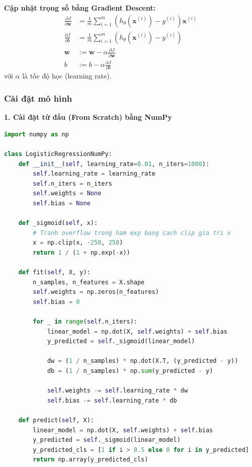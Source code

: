 \documentclass[12pt,a4paper]{article}
\begin{document}
\textbf{Cập nhật trọng số bằng Gradient Descent:}
\begin{align}
\frac{\partial J}{\partial \mathbf{w}} &= \frac{1}{m} \sum_{i=1}^{m} \left( h_{\theta}(\mathbf{x}^{(i)}) - y^{(i)} \right) \mathbf{x}^{(i)} \\
\frac{\partial J}{\partial b} &= \frac{1}{m} \sum_{i=1}^{m} \left( h_{\theta}(\mathbf{x}^{(i)}) - y^{(i)} \right) \\
\mathbf{w} &:= \mathbf{w} - \alpha \frac{\partial J}{\partial \mathbf{w}} \\
b &:= b - \alpha \frac{\partial J}{\partial b}
\end{align}
với $\alpha$ là tốc độ học (learning rate).

\newpage
\subsubsection{Cài đặt mô hình}

\textbf{1. Cài đặt từ đầu (From Scratch) bằng NumPy}
\begin{lstlisting}[language=Python]
import numpy as np

class LogisticRegressionNumPy:
    def __init__(self, learning_rate=0.01, n_iters=1000):
        self.learning_rate = learning_rate
        self.n_iters = n_iters
        self.weights = None
        self.bias = None
        
    def _sigmoid(self, x):
        # Tranh overflow trong ham exp bang cach clip gia tri x
        x = np.clip(x, -250, 250)
        return 1 / (1 + np.exp(-x))
        
    def fit(self, X, y):
        n_samples, n_features = X.shape
        self.weights = np.zeros(n_features)
        self.bias = 0
        
        for _ in range(self.n_iters):
            linear_model = np.dot(X, self.weights) + self.bias
            y_predicted = self._sigmoid(linear_model)
            
            dw = (1 / n_samples) * np.dot(X.T, (y_predicted - y))
            db = (1 / n_samples) * np.sum(y_predicted - y)
            
            self.weights -= self.learning_rate * dw
            self.bias -= self.learning_rate * db
            
    def predict(self, X):
        linear_model = np.dot(X, self.weights) + self.bias
        y_predicted = self._sigmoid(linear_model)
        y_predicted_cls = [1 if i > 0.5 else 0 for i in y_predicted]
        return np.array(y_predicted_cls)
\end{lstlisting}
\end{document}

